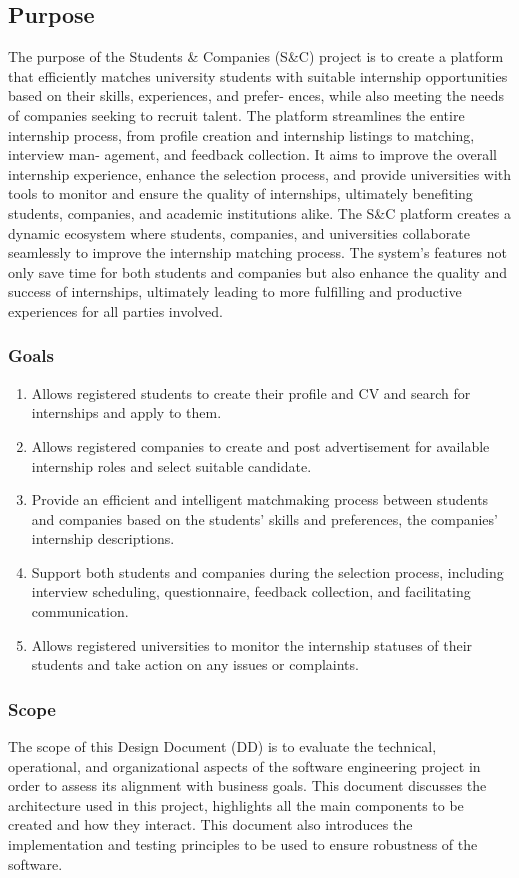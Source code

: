 \subsection{Purpose}
The purpose of the Students \& Companies (S\&C) project is to create a platform that efficiently matches university students with suitable internship opportunities based on their skills, experiences, and prefer- ences, while also meeting the needs of companies seeking to recruit talent. The platform streamlines the entire internship process, from profile creation and internship listings to matching, interview man- agement, and feedback collection. It aims to improve the overall internship experience, enhance the selection process, and provide universities with tools to monitor and ensure the quality of internships, ultimately benefiting students, companies, and academic institutions alike.
The S\&C platform creates a dynamic ecosystem where students, companies, and universities collaborate seamlessly to improve the internship matching process. The system’s features not only save time for both students and companies but also enhance the quality and success of internships, ultimately leading to more fulfilling and productive experiences for all parties involved.

\subsubsection{Goals}
\begin{enumerate}[label=G{\arabic*}]
\item
Allows registered students to create their profile and CV and search for internships and apply to them.
\item
Allows registered companies to create and post advertisement for available internship roles and select suitable candidate.
\item 
Provide an efficient and intelligent matchmaking process between students and companies based on the students' skills and preferences, the companies' internship descriptions.
\item
Support both students and companies during the selection process, including interview scheduling, questionnaire, feedback collection, and facilitating communication.
\item
Allows registered universities to monitor the internship statuses of their students and take action on any issues or complaints.

\end{enumerate}
\subsubsection{Scope}
The scope of this Design Document (DD) is to evaluate the technical, operational, and organizational aspects of the software engineering project in order to assess its alignment with business goals. This document discusses the architecture used in this project, highlights all the main components to be created and how they interact. This document also introduces the implementation and testing principles to be used to ensure robustness of the software.


